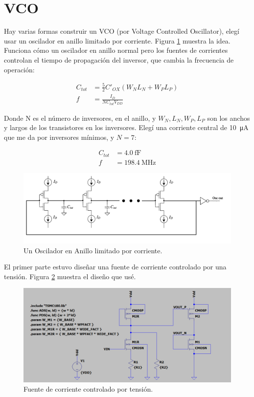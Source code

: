 \documentclass[a4paper]{article}
\begin{document}
\section{VCO}

Hay varias formas construir un VCO (por Voltage Controlled Oscillator), elegí usar un oscilador en anillo limitado por corriente. Figura \ref{fig:csro1} muestra la idea. Funciona cómo un oscilador en anillo normal pero los fuentes de corrientes controlan el tiempo de propagación del inversor, que cambia la frecuencia de operación:

\begin{align*}
C_{tot} &= \frac{5}{2} C\prime_{OX}(W_N L_N + W_P L_P) \\
f &= \frac{I_D}{N C_{tot} V_{DD}}
\end{align*}

Donde N es el número de inversores, en el anillo, y $W_N, L_N, W_P, L_P$ son los anchos y largos de los transistores en los inversores. Elegí una corriente central de \SI{10}{\micro\ampere} que me da por inversores mínimos, y $N = 7$:

\begin{align*}
C_{tot} &= \SI{4.0}{\femto\farad} \\
f &= \SI{198.4}{\mega\hertz}
\end{align*}

\begin{figure}[!htb]
\centering
\includegraphics[scale=0.4]{./img/csro1}
\caption{Un Oscilador en Anillo limitado por corriente.}
\label{fig:csro1}
\end{figure}

El primer parte estuvo diseñar una fuente de corriente controlado por una tensión. Figura \ref{fig:current_source_sch} muestra el diseño que usé.

\begin{figure}[!htb]
\centering
\includegraphics[scale=0.4]{./img/current_source_sch}
\caption{Fuente de corriente controlado por tensión.}
\label{fig:current_source_sch}
\end{figure}
\end{document}
